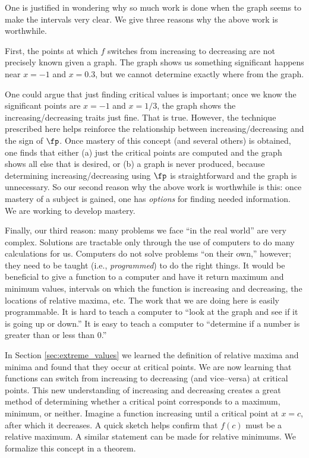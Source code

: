 \enlargethispage{2\baselineskip}
One is justified in wondering why so much work is done when the graph seems to make the intervals very clear. We give three reasons why the above work is worthwhile.

First, the points at which $f$ switches from increasing to decreasing are not precisely known given a graph. The graph shows us something significant happens near $x=-1$ and $x=0.3$, but we cannot determine exactly where from the graph. 

One could argue that just finding critical values is important; once we know the significant points are $x=-1$ and $x=1/3$, the graph shows the increasing/decreasing traits just fine. That is true. However, the technique prescribed here helps reinforce the relationship between increasing/decreasing and the sign of $\fp$. Once mastery of this concept (and several others) is obtained, one finds that either (a) just the critical points are computed and the graph shows all else that is desired, or (b) a graph is never produced, because determining increasing/decreasing using $\fp$ is straightforward and the graph is unnecessary. 
So our second reason why the above work is worthwhile is this: once mastery of a subject is gained, one has \textit{options} for finding needed information. We are working to develop mastery.

Finally, our third reason: many problems we face ``in the real world'' are very complex. Solutions are tractable only through the use of computers to do many calculations for us. Computers do not solve problems ``on their own,'' however; they need to be taught (i.e., \textit{programmed}) to do the right things. It would be beneficial to give a function to a computer and have it return maximum and minimum values, intervals on which the function is increasing and decreasing, the locations of relative maxima, etc. The work that we are doing here is easily programmable. It is hard to teach a computer to ``look at the graph and see if it is going up or down.'' It is easy to teach a computer to ``determine if a number is greater than or less than 0.''
\pagebreak

\enlargethispage{3\baselineskip}
In Section \ref{sec:extreme_values} we learned the definition of relative maxima and minima and found that they occur at critical points. We are now learning that functions can switch from increasing to decreasing (and vice--versa) at critical points. This new understanding of increasing and decreasing creates a great method of determining whether a critical point corresponds to a maximum, minimum, or neither. Imagine a function increasing until a critical point at $x=c$, after which it decreases. A quick sketch helps confirm that $f(c)$ must be a relative maximum. A similar statement can be made for relative minimums. We formalize this concept in a theorem.

